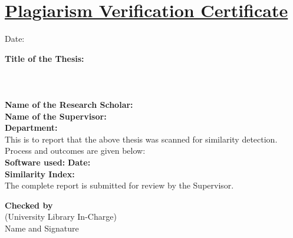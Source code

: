 \chapter*{\uline{Plagiarism Verification Certificate}}

\begin{flushright} 
Date: \underline{\hspace{3cm}} 
\end{flushright} 
\vspace{.1cm} 
\noindent 
\textbf{Title of the Thesis:} \\ \underline{\hspace{\textwidth}} \\ \underline{\hspace{\textwidth}} \\ \underline{\hspace{\textwidth}} \\ 
\vspace{.1cm} 
\noindent 
\textbf{Name of the Research Scholar:} \underline{\hspace{.1cm}} \\ 
\vspace{0.1cm} 
\noindent 
\textbf{Name of the Supervisor:} 
\underline{\hspace{.1cm}} \\ 
\vspace{0.1cm} \noindent 
\textbf{Department:} 
\underline{\hspace{.1cm}} \\ 
\vspace{.1cm} 
\noindent 
\justifying
This is to report that the above thesis was scanned for similarity detection. Process and outcomes are given below:\\ \vspace{0.1cm} 
\noindent 
\textbf{Software used:} 
\underline{\hspace{5cm}} 
\hfill \textbf{Date:} \underline{\hspace{5cm}} \\ \vspace{0.1cm} 
\noindent \textbf{Similarity Index:} \underline{\hspace{5cm}} \\ \vspace{0.1cm} 
\noindent 
The complete report is submitted for review by the Supervisor. 
\vspace{.1cm} 
\noindent 
\begin{flushright} 
\textbf{Checked by} \\ 
(University Library In-Charge) \\ 
Name and Signature \\ 
\underline{\hspace{5cm}} 
\end{flushright} 
